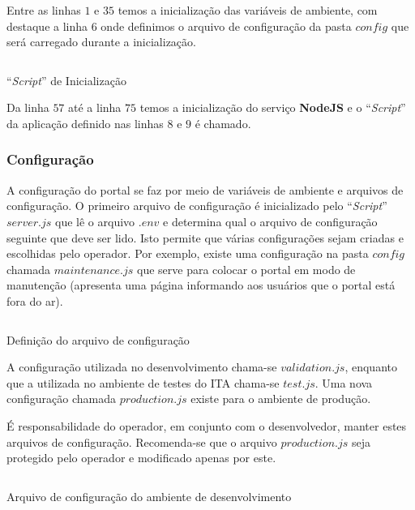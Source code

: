 Entre as linhas $1$ e $35$ temos a inicialização das variáveis de ambiente, com destaque a linha $6$ onde definimos o arquivo de configuração da pasta $config$ que será carregado durante a inicialização.

\begin{code}
    \inputminted[label=portal,firstline=57,lastline=75]{Shell}{../RS0004/anexos/portal}
    \caption{``\textit{Script}'' de Inicialização}\label{RS0004:code:start}
\end{code}

Da linha $57$ até a linha $75$ temos a inicialização do serviço \textbf{NodeJS} e o ``\textit{Script}'' da aplicação definido nas linhas $8$ e $9$ é chamado.

\subsubsection{Configuração}

A configuração do portal se faz por meio de variáveis de ambiente e arquivos de configuração. O primeiro arquivo de configuração é inicializado pelo ``\textit{Script}'' $server.js$ que lê o arquivo $.env$ e determina qual o arquivo de configuração seguinte que deve ser lido. Isto permite que várias configurações sejam criadas e escolhidas pelo operador. Por exemplo, existe uma configuração na pasta $config$ chamada $maintenance.js$ que serve para colocar o portal em modo de manutenção (apresenta uma página informando aos usuários que o portal está fora do ar).

\begin{code}
    \inputminted[label=.env]{Shell}{../RS0004/anexos/env}
    \caption{Definição do arquivo de configuração}\label{RS0004:code:env}
\end{code}

A configuração utilizada no desenvolvimento chama-se $validation.js$, enquanto que a utilizada no ambiente de testes do ITA chama-se $test.js$. Uma nova configuração chamada $production.js$ existe para o ambiente de produção.

\begin{displayquote}
    É responsabilidade do operador, em conjunto com o desenvolvedor, manter estes arquivos de configuração. Recomenda-se que o arquivo $production.js$ seja protegido pelo operador e modificado apenas por este.
\end{displayquote}

\begin{code}
    \inputminted[label=validation.js]{JavaScript}{../RS0004/anexos/validation.js}
    \caption{Arquivo de configuração do ambiente de desenvolvimento}\label{RS0004:code:validation}
\end{code}

